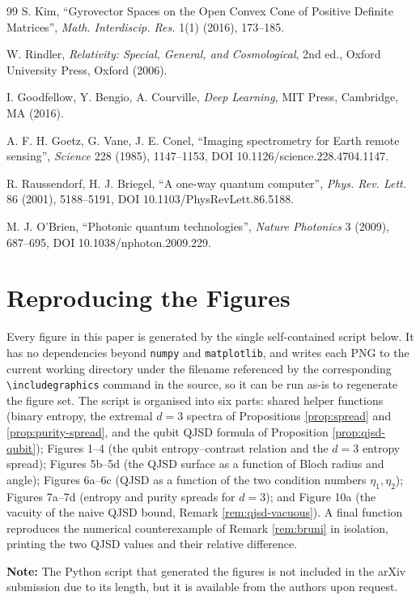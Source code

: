 \documentclass{article}
\theoremstyle{remark}
\begin{document}
\begin{thebibliography}{99}
 S. Kim, ``Gyrovector Spaces on the Open Convex Cone of Positive Definite Matrices'', \emph{Math. Interdiscip. Res.} 1(1) (2016), 173--185.

 W. Rindler, \emph{Relativity: Special, General, and Cosmological}, 2nd ed., Oxford University Press, Oxford (2006).

 I. Goodfellow, Y. Bengio, A. Courville, \emph{Deep Learning}, MIT Press, Cambridge, MA (2016).

 A. F. H. Goetz, G. Vane, J. E. Conel, ``Imaging spectrometry for Earth remote sensing'', \emph{Science} 228 (1985), 1147--1153, DOI 10.1126/science.228.4704.1147.

 R. Raussendorf, H. J. Briegel, ``A one-way quantum computer'', \emph{Phys. Rev. Lett.} 86 (2001), 5188--5191, DOI 10.1103/PhysRevLett.86.5188.

 M. J. O'Brien, ``Photonic quantum technologies'', \emph{Nature Photonics} 3 (2009), 687--695, DOI 10.1038/nphoton.2009.229.

\end{thebibliography}


\appendix
\section{Reproducing the Figures}\label{app:code}

Every figure in this paper is generated by the single self-contained script below. It has no dependencies beyond \texttt{numpy} and \texttt{matplotlib}, and writes each PNG to the current working directory under the filename referenced by the corresponding \verb|\includegraphics| command in the source, so it can be run as-is to regenerate the figure set. The script is organised into six parts: shared helper functions (binary entropy, the extremal $d=3$ spectra of Propositions \ref{prop:spread} and \ref{prop:purity-spread}, and the qubit QJSD formula of Proposition \ref{prop:qjsd-qubit}); Figures 1--4 (the qubit entropy--contrast relation and the $d=3$ entropy spread); Figures 5b--5d (the QJSD surface as a function of Bloch radius and angle); Figures 6a--6c (QJSD as a function of the two condition numbers $\eta_1,\eta_2$); Figures 7a--7d (entropy and purity spreads for $d=3$); and Figure 10a (the vacuity of the naive QJSD bound, Remark \ref{rem:qjsd-vacuous}). A final function reproduces the numerical counterexample of Remark \ref{rem:bruni} in isolation, printing the two QJSD values and their relative difference.

\textbf{Note:} The Python script that generated the figures is not included in the arXiv submission due to its length, but it is available from the authors upon request.

% 
\end{document}
